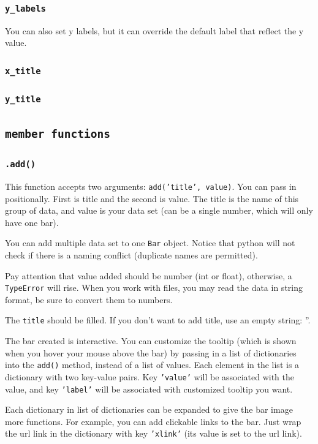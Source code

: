 \documentclass[12pt]{book}
\begin{document}
\subsubsection{\texttt{y\_labels}}
\label{sec:org358b180}
You can also set y labels, but it can override the default label that reflect the y value.
\subsubsection{\texttt{x\_title}}
\label{sec:org2529a31}
\subsubsection{\texttt{y\_title}}
\label{sec:org65f94c3}
\subsection{\texttt{member functions}}
\label{sec:org33f4f0d}
\subsubsection{\texttt{.add()}}
\label{sec:org0838844}
This function accepts two arguments: \texttt{add('title', value)}. You can pass in positionally. First is title and the second is value. The title is the name of this group of data, and value is your data set (can be a single number, which will only have one bar).

You can add multiple data set to one \texttt{Bar} object. Notice that python will not check if there is a naming conflict (duplicate names are permitted).

Pay attention that value added should be number (int or float), otherwise, a \texttt{TypeError} will rise. When you work with files, you may read the data in string format, be sure to convert them to numbers.

The \texttt{title} should be filled. If you don't want to add title, use an empty string: ''.

The bar created is interactive. You can customize the tooltip (which is shown when you hover your mouse above the bar) by passing in a list of dictionaries into the \texttt{add()} method, instead of a list of values. Each element in the list is a dictionary with two key-value pairs. Key \texttt{'value'} will be associated with the value, and key \texttt{'label'} will be associated with customized tooltip you want.

Each dictionary in list of dictionaries can be expanded to give the bar image more functions. For example, you can add clickable links to the bar. Just wrap the url link in the dictionary with key \texttt{'xlink'} (its value is set to the url link).
\end{document}
